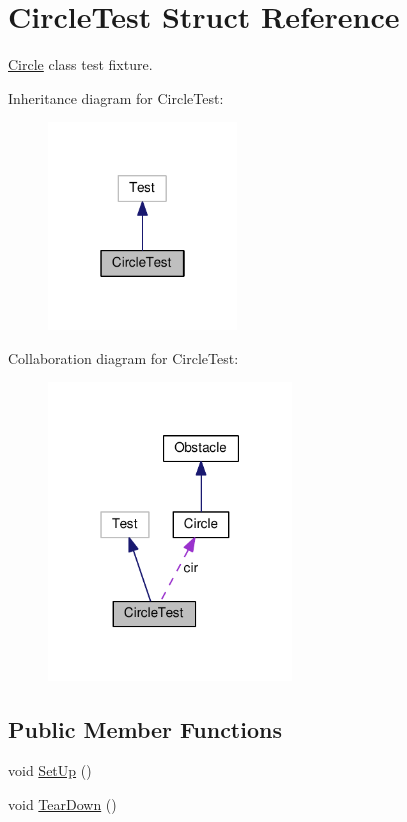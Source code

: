 \hypertarget{structCircleTest}{}\section{Circle\+Test Struct Reference}
\label{structCircleTest}


\hyperlink{classCircle}{Circle} class test fixture.  




Inheritance diagram for Circle\+Test\+:
\nopagebreak
\begin{figure}[H]
\begin{center}
\leavevmode
\includegraphics[width=142pt]{structCircleTest__inherit__graph}
\end{center}
\end{figure}


Collaboration diagram for Circle\+Test\+:
\nopagebreak
\begin{figure}[H]
\begin{center}
\leavevmode
\includegraphics[width=183pt]{structCircleTest__coll__graph}
\end{center}
\end{figure}
\subsection*{Public Member Functions}
\begin{DoxyCompactItemize}
\item 
void \hyperlink{structCircleTest_a57ef2225672262bbee9911bb0f249212}{Set\+Up} ()
\item 
void \hyperlink{structCircleTest_a77a5186daec84ff2c67d44d3464783e0}{Tear\+Down} ()
\end{DoxyCompactItemize}
